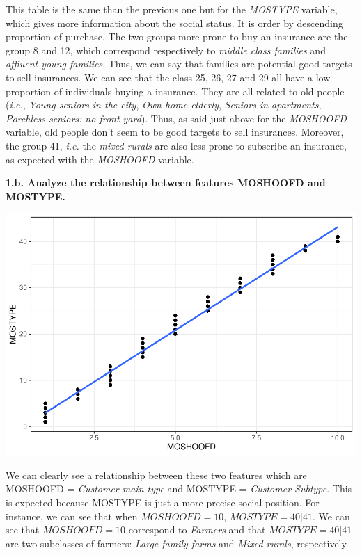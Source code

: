\documentclass[
  12pt,
  oneside]{report}
\begin{document}
This table is the same than the previous one but for the \emph{MOSTYPE} variable, which gives more information about the social status. It is order by descending proportion of purchase. The two groups more prone to buy an insurance are the group 8 and 12, which correspond respectively to \emph{middle class families} and \emph{affluent young families}. Thus, we can say that families are potential good targets to sell insurances. We can see that the class 25, 26, 27 and 29 all have a low proportion of individuals buying a insurance. They are all related to old people (\emph{i.e.}, \emph{Young seniors in the city}, \emph{Own home elderly}, \emph{Seniors in apartments}, \emph{Porchless seniors: no front yard}). Thus, as said just above for the \emph{MOSHOOFD} variable, old people don't seem to be good targets to sell insurances. Moreover, the group 41, \emph{i.e.} the \emph{mixed rurals} are also less prone to subscribe an insurance, as expected with the \emph{MOSHOOFD} variable.

\textbf{1.b. Analyze the relationship between features MOSHOOFD and MOSTYPE.}

\includegraphics{leroy_francois_hw2_files/figure-latex/unnamed-chunk-9-1.pdf}

We can clearly see a relationship between these two features which are MOSHOOFD = \emph{Customer main type} and MOSTYPE = \emph{Customer Subtype}. This is expected because MOSTYPE is just a more precise social position. For instance, we can see that when \(MOSHOOFD = 10\), \(MOSTYPE = 40 | 41\). We can see that \(MOSHOOFD = 10\) correspond to \emph{Farmers} and that \(MOSTYPE = 40 | 41\) are two subclasses of farmers: \emph{Large family farms} and \emph{Mixed rurals}, respectively.
\end{document}
